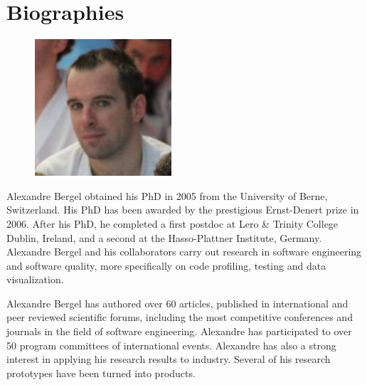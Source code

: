 \documentclass[a4paper,10pt,twoside]{book}
\begin{document}
	\sloppy
	\frontmatter
\fi
\chapter{Biographies}

\begin{figure}
\centering
\includegraphics[width=2in]{alexandre.pdf}
\end{figure}

Alexandre Bergel obtained his PhD in 2005 from the University of Berne, Switzerland. His PhD has been awarded by the prestigious Ernst-Denert prize in 2006. After his PhD, he completed a first postdoc at Lero & Trinity College Dublin, Ireland, and a second at the Hasso-Plattner Institute, Germany. Alexandre Bergel and his collaborators carry out research in software engineering and software quality, more specifically on code profiling, testing and data visualization.

Alexandre Bergel has authored over 60 articles, published in international and peer reviewed scientific forums, including the most competitive conferences and journals in the field of software engineering. Alexandre has participated to over 50 program committees of international events. Alexandre has also a strong interest in applying his research results to industry. Several of his research prototypes have been turned into products.




\ifx\wholebook\relax\else
   
   
\end{document}
